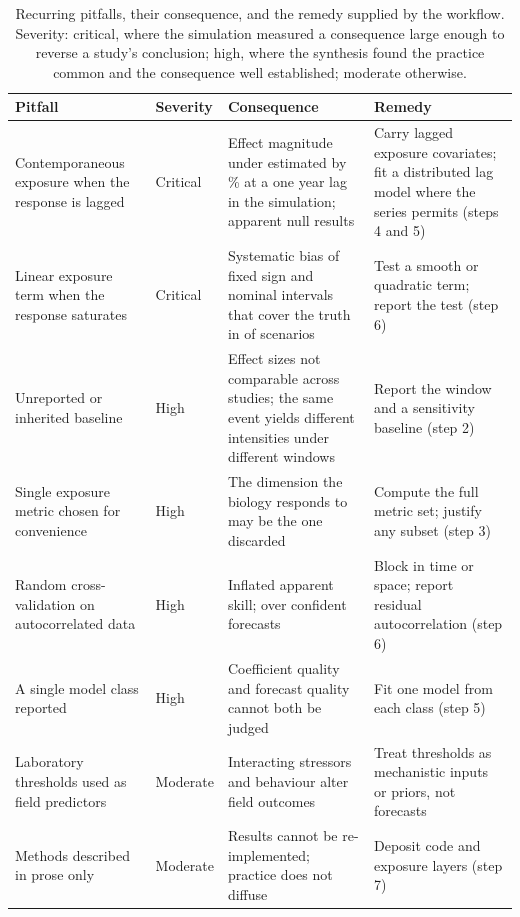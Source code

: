 \begin{table}[H]
\centering
\caption{Recurring pitfalls, their consequence, and the remedy supplied by the workflow. Severity: critical, where the simulation measured a consequence large enough to reverse a study's conclusion; high, where the synthesis found the practice common and the consequence well established; moderate otherwise.}
\label{tab:pitfalls}
\small
\begin{tabular}{p{3.4cm}p{1.6cm}p{4.6cm}p{4.6cm}}
\toprule
Pitfall & Severity & Consequence & Remedy \\
\midrule
Contemporaneous exposure when the response is lagged & Critical & Effect magnitude under estimated by \naiveRelBiasLagOne{}\% at a one year lag in the simulation; apparent null results & Carry lagged exposure covariates; fit a distributed lag model where the series permits (steps 4 and 5) \\
\addlinespace
Linear exposure term when the response saturates & Critical & Systematic bias of fixed sign and nominal intervals that cover the truth in \linearCoverageRange{} of scenarios & Test a smooth or quadratic term; report the test (step 6) \\
\addlinespace
Unreported or inherited baseline & High & Effect sizes not comparable across studies; the same event yields different intensities under different windows & Report the window and a sensitivity baseline (step 2) \\
\addlinespace
Single exposure metric chosen for convenience & High & The dimension the biology responds to may be the one discarded & Compute the full metric set; justify any subset (step 3) \\
\addlinespace
Random cross-validation on autocorrelated data & High & Inflated apparent skill; over confident forecasts & Block in time or space; report residual autocorrelation (step 6) \\
\addlinespace
A single model class reported & High & Coefficient quality and forecast quality cannot both be judged & Fit one model from each class (step 5) \\
\addlinespace
Laboratory thresholds used as field predictors & Moderate & Interacting stressors and behaviour alter field outcomes & Treat thresholds as mechanistic inputs or priors, not forecasts \\
\addlinespace
Methods described in prose only & Moderate & Results cannot be re-implemented; practice does not diffuse & Deposit code and exposure layers (step 7) \\
\bottomrule
\end{tabular}
\end{table}

